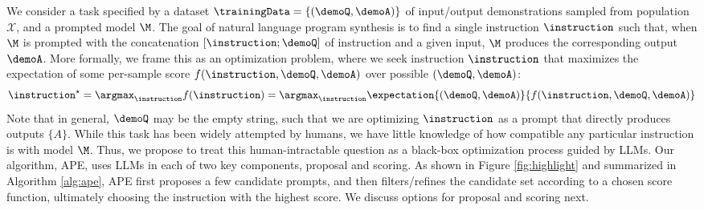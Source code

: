 
We consider a task specified by a dataset $\trainingData = \{(\demoQ, \demoA)\}$ of input/output demonstrations sampled from population $\mathcal{X}$, and a prompted model $\M$. 
The goal of natural language program synthesis is to find a single instruction $\instruction$ such that, when $\M$ is prompted with the concatenation $[\instruction ; \demoQ]$ of instruction and a given input, $\M$ produces the corresponding output $\demoA$. More formally, we frame this as an optimization problem, where we seek instruction $\instruction$ that maximizes the expectation of some per-sample score $f(\instruction, \demoQ, \demoA)$ over possible $(\demoQ, \demoA)$:
\begin{equation}\label{eq:score}
\instruction^{\star} = \argmax_\instruction f(\instruction) =  \argmax_\instruction \expectation{(\demoQ, \demoA)}{f(\instruction,\demoQ, \demoA)}
\end{equation}
Note that in general, $\demoQ$ may be the empty string, such that we are optimizing $\instruction$ as a prompt that directly produces outputs $\{A\}$.
While this task has been widely attempted by humans, we have little knowledge of how compatible any particular instruction is with model $\M$. Thus, we propose to treat this human-intractable question as a black-box optimization process guided by LLMs. 
Our algorithm, APE, uses LLMs in each of two key components, proposal and scoring. As shown in Figure \ref{fig:highlight} and summarized in Algorithm \ref{alg:ape}, APE first proposes a few candidate prompts, and then filters/refines the candidate set according to a chosen score function, ultimately choosing the instruction with the highest score. We discuss options for proposal and scoring next. 

